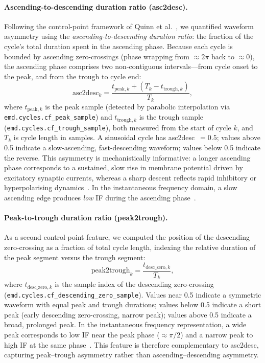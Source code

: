 \documentclass[11pt, a4paper]{article}
\newcommand{\asc}{asc2desc}
\begin{document}
\paragraph{Ascending-to-descending duration ratio (asc2desc).}
Following the control-point framework of Quinn et al.~\citeyearpar{quinn2021within},
we quantified waveform asymmetry using the \textit{ascending-to-descending
duration ratio}: the fraction of the cycle's total duration spent in the
ascending phase. Because each cycle is bounded by ascending zero-crossings
(phase wrapping from $\approx 2\pi$ back to $\approx 0$), the ascending
phase comprises two non-contiguous intervals---from cycle onset to the
peak, and from the trough to cycle end:
%
\begin{equation}
  \text{asc2desc}_k = \frac{t_{\text{peak},k} + (T_k - t_{\text{trough},k})}{T_k},
  \label{eq:asc2desc}
\end{equation}
%
where $t_{\text{peak},k}$ is the peak sample (detected by parabolic
interpolation via \texttt{emd.cycles.cf\_peak\_sample}) and
$t_{\text{trough},k}$ is the trough sample
(\texttt{emd.cycles.cf\_trough\_sample}), both measured from the start of
cycle $k$, and $T_k$ is cycle length in samples. A sinusoidal cycle has
\asc~$= 0.5$; values above 0.5 indicate a slow-ascending, fast-descending
waveform; values below 0.5 indicate the reverse. This asymmetry is
mechanistically informative: a longer ascending phase corresponds to a
sustained, slow rise in membrane potential driven by excitatory synaptic
currents, whereas a sharp descent reflects rapid inhibitory or
hyperpolarising dynamics~\citep{cole2017brain, schaworonkow2019waveform}.
In the instantaneous frequency domain, a slow ascending edge produces
\emph{low} IF during the ascending phase~\citep{quinn2021within}.

\paragraph{Peak-to-trough duration ratio (peak2trough).}
As a second control-point feature, we computed the position of the
descending zero-crossing as a fraction of total cycle length, indexing
the relative duration of the peak segment versus the trough segment:
%
\begin{equation}
  \text{peak2trough}_k = \frac{t_{\text{desc\_zero},k}}{T_k},
  \label{eq:peak2trough}
\end{equation}
%
where $t_{\text{desc\_zero},k}$ is the sample index of the descending
zero-crossing (\texttt{emd.cycles.cf\_descending\_zero\_sample}).
Values near 0.5 indicate a symmetric waveform with equal peak and trough
durations; values below 0.5 indicate a short peak (early descending
zero-crossing, narrow peak); values above 0.5 indicate a broad, prolonged
peak. In the instantaneous frequency representation, a wide peak corresponds
to low IF near the peak phase ($\approx \pi/2$) and a narrow peak to high IF
at the same phase~\citep{quinn2021within}. This feature is therefore
complementary to \asc, capturing peak--trough asymmetry rather than
ascending--descending asymmetry.
\end{document}
